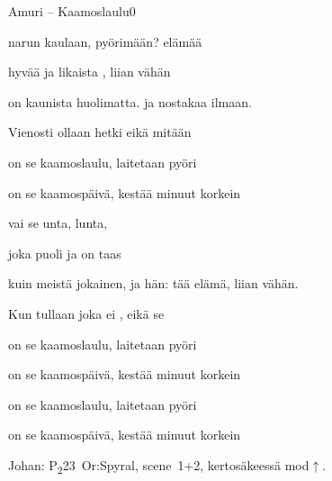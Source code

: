 \documentclass[12pt,a4paper]{article}
\begin{document}
\thispagestyle{empty}
\begin{mysong}{Amuri – Kaamoslaulu}{0}


\begin{SBVerse}
   narun kaulaan,  pyörimään?
   elämää 

  hyvää ja  likaista , liian vähän

   on kaunista  huolimatta. 
  ja nostakaa  ilmaan.

  Vienosti  ollaan hetki  eikä mitään
\end{SBVerse}

\begin{SBChorus}
   on se kaamoslaulu,  laitetaan
   pyöri

   on se kaamospäivä,  kestää 
  minuut korkein
\end{SBChorus}

\begin{SBVerse}
    vai  se unta,
   lunta,

  joka  puoli ja on taas 

   kuin meistä jokainen,  ja hän:  tää
  elämä,  liian vähän.

  Kun tullaan  joka ei , eikä se 
\end{SBVerse}

\begin{SBChorus}
   on se kaamoslaulu,  laitetaan
   pyöri

   on se kaamospäivä,  kestää 
  minuut korkein
\end{SBChorus}


\begin{SBChorus}
   on se kaamoslaulu,  laitetaan
   pyöri

   on se kaamospäivä,  kestää 
  minuut korkein
\end{SBChorus}


{\SBLyricNoteFont Johan: P\textsubscript{2}23~Or:Spyral, scene~1+2,
kertosäkeessä mod$\uparrow$.}

\end{mysong}
\end{document}
